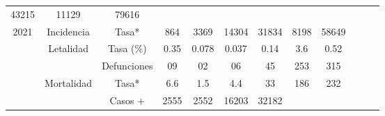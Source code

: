 \begin{tabular}{ccc|cccccc|lll}
		\multicolumn{1}{c|}{\cellcolor[HTML]{FFFC9E}43215} &
		\multicolumn{1}{c|}{\cellcolor[HTML]{FFFC9E}11129} &
		\cellcolor[HTML]{FFFC9E}79616 &
		&
		&
		\\ \cline{2-9}
		\multicolumn{1}{|c|}{\multirow{-5}{*}{\cellcolor[HTML]{FFFC9E}2021}} &
		\multicolumn{1}{c|}{\cellcolor[HTML]{FFFC9E}Incidencia} &
		\cellcolor[HTML]{FFFC9E}Tasa* &
		\multicolumn{1}{c|}{\cellcolor[HTML]{FFFC9E}864} &
		\multicolumn{1}{c|}{\cellcolor[HTML]{FFFC9E}3369} &
		\multicolumn{1}{c|}{\cellcolor[HTML]{FFFC9E}14304} &
		\multicolumn{1}{c|}{\cellcolor[HTML]{FFFC9E}31834} &
		\multicolumn{1}{c|}{\cellcolor[HTML]{FFFC9E}8198} &
		\cellcolor[HTML]{FFFC9E}58649 &
		&
		&
		\\ \cline{1-9}
		\multicolumn{1}{|c|}{\cellcolor[HTML]{C1EFC0}} &
		\multicolumn{1}{c|}{\cellcolor[HTML]{C1EFC0}Letalidad} &
		\cellcolor[HTML]{C1EFC0}Tasa (\%) &
		\multicolumn{1}{c|}{\cellcolor[HTML]{C1EFC0}0.35} &
		\multicolumn{1}{c|}{\cellcolor[HTML]{C1EFC0}0.078} &
		\multicolumn{1}{c|}{\cellcolor[HTML]{C1EFC0}0.037} &
		\multicolumn{1}{c|}{\cellcolor[HTML]{C1EFC0}0.14} &
		\multicolumn{1}{c|}{\cellcolor[HTML]{C1EFC0}3.6} &
		\cellcolor[HTML]{C1EFC0}0.52 &
		&
		&
		\\ \cline{3-9}
		\multicolumn{1}{|c|}{\cellcolor[HTML]{C1EFC0}} &
		\multicolumn{1}{c|}{\cellcolor[HTML]{C1EFC0}} &
		\cellcolor[HTML]{C1EFC0}Defunciones &
		\multicolumn{1}{c|}{\cellcolor[HTML]{C1EFC0}09} &
		\multicolumn{1}{c|}{\cellcolor[HTML]{C1EFC0}02} &
		\multicolumn{1}{c|}{\cellcolor[HTML]{C1EFC0}06} &
		\multicolumn{1}{c|}{\cellcolor[HTML]{C1EFC0}45} &
		\multicolumn{1}{c|}{\cellcolor[HTML]{C1EFC0}253} &
		\cellcolor[HTML]{C1EFC0}315 &
		&
		&
		\\ \cline{3-9}
		\multicolumn{1}{|c|}{\cellcolor[HTML]{C1EFC0}} &
		\multicolumn{1}{c|}{\cellcolor[HTML]{C1EFC0}Mortalidad} &
		\cellcolor[HTML]{C1EFC0}Tasa* &
		\multicolumn{1}{c|}{\cellcolor[HTML]{C1EFC0}6.6} &
		\multicolumn{1}{c|}{\cellcolor[HTML]{C1EFC0}1.5} &
		\multicolumn{1}{c|}{\cellcolor[HTML]{C1EFC0}4.4} &
		\multicolumn{1}{c|}{\cellcolor[HTML]{C1EFC0}33} &
		\multicolumn{1}{c|}{\cellcolor[HTML]{C1EFC0}186} &
		\cellcolor[HTML]{C1EFC0}232 &
		&
		&
		\\ \cline{3-9}
		\multicolumn{1}{|c|}{\cellcolor[HTML]{C1EFC0}} &
		\multicolumn{1}{c|}{\cellcolor[HTML]{C1EFC0}} &
		\cellcolor[HTML]{C1EFC0}Casos + &
		\multicolumn{1}{c|}{\cellcolor[HTML]{C1EFC0}2555} &
		\multicolumn{1}{c|}{\cellcolor[HTML]{C1EFC0}2552} &
		\multicolumn{1}{c|}{\cellcolor[HTML]{C1EFC0}16203} &
		\multicolumn{1}{c|}{\cellcolor[HTML]{C1EFC0}32182} &

\end{tabular}
